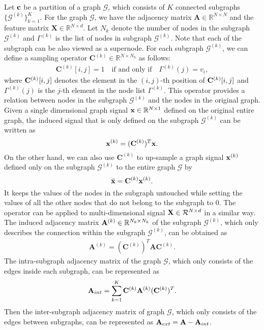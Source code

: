 \documentclass[sigconf]{acmart}
\begin{document}
Let ${\bf c}$ be a partition of a graph $\mathcal{G}$, which consists of $K$ connected subgraphs $\{\mathcal{G}^{(k)}\}_{k=1}^K.$ For the graph $\mathcal{G}$, we have the adjacency matrix $\mathbf{A}\in \mathbb{R}^{N\times N}$ and the feature matrix $\mathbf{X}\in \mathbb{R}^{N\times d}$. Let $N_k$ denote the number of nodes in the subgraph $\mathcal{G}^{(k)}$ and $\Gamma^{(k)}$ is the list of nodes in subgraph $\mathcal{G}^{(k)}$. Note that each of the subgraph can be also viewed as a supernode. For each subgraph $\mathcal{G}^{(k)}$, we can define a sampling operator $\mathbf{C}^{(k)} \in  \mathbb{R}^{N\times N_k}$ as follows:
\begin{align}
    \mathbf{C}^{(k)}[i,j] = 1 \quad \text{if and only if} \quad \Gamma^{(k)}(j) = v_i,
\end{align}
where ${\bf C}^{(k)}[i,j]$ denotes the element in the $(i,j)$-th position of ${\bf C}^{(k)}[i,j]$ and $\Gamma^{(k)}(j)$ is the $j$-th element in the node list $\Gamma^{(k)}$. This operator provides a relation between nodes in the subgraph $\mathcal{G}^{(k)}$ and the nodes in the original graph. Given a single dimensional graph signal ${\bf x} \in \mathbb{R}^{N\times 1}$ defined on the original entire graph, the induced signal that is only defined on the subgraph $\mathcal{G}^{(k)}$ can be written as  
\begin{equation}
    {\bf x}^{(k)} = ({\bf C}^{(k)})^T {\bf x}.
\end{equation}
On the other hand, we can also use $\mathbf{C}^{(k)}$ to up-sample a graph signal ${\bf x}^{(k)}$ defined only on the subgraph $\mathcal{G}^{(k)}$ to the entire graph $\mathcal{G}$ by 
\begin{equation}
    {\bar{\bf x}}=\mathbf{C}^{(k)} {\bf x}^{(k)}.
\end{equation}
It keeps the values of the nodes in the subgraph untouched while setting the values of all the other nodes that do not belong to the subgraph to $0$. The operator can be applied to multi-dimensional signal ${\bf X}\in {\mathcal{R}^{N\times d}}$ in a similar way. The induced adjacency matrix ${\bf A}^{(k)} \in \mathbb{R}^{N_k\times N_k}$ of the subgraph $\mathcal{G}^{(k)}$, which only describes the connection within the subgraph $\mathcal{G}^{(k)}$, can be obtained as
\begin{align}
    \mathbf{A}^{(k)} = (\mathbf{C}^{(k)} )^T \mathbf{A}  \mathbf{C}^{(k)}.
\end{align}
The intra-subgraph adjacency matrix of the graph $\mathcal{G}$, which only consists of the edges inside each subgraph, can be represented as
\begin{align}
    \mathbf{A}_{int} = \sum\limits_{k=1}^{K} {\bf C}^{(k)} {\bf A}^{(k)}  ({\bf C}^{(k)})^T.
\end{align}
Then the inter-subgraph adjacency matrix of graph $\mathcal{G}$, which only consists of the edges between subgraphs, can be represented as ${\bf A}_{ext}={\bf A} - {\bf A}_{int}$. 
\end{document}
